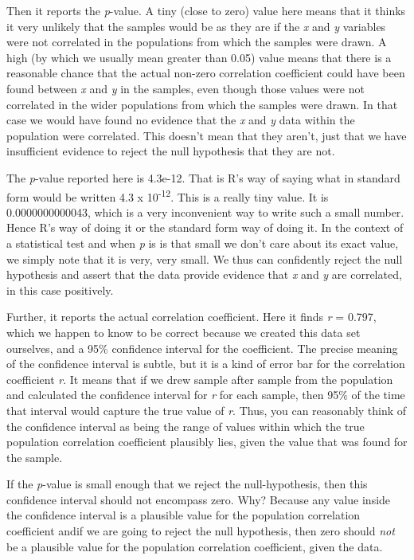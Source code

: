 \documentclass[
  letterpaper,
  DIV=11,
  numbers=noendperiod]{scrreprt}
\begin{document}
Then it reports the \emph{p}-value. A tiny (close to zero) value here
means that it thinks it very unlikely that the samples would be as they
are if the \emph{x} and \emph{y} variables were not correlated in the
populations from which the samples were drawn. A high (by which we
usually mean greater than 0.05) value means that there is a reasonable
chance that the actual non-zero correlation coefficient could have been
found between \emph{x} and \emph{y} in the samples, even though those
values were not correlated in the wider populations from which the
samples were drawn. In that case we would have found no evidence that
the \emph{x} and \emph{y} data within the population were correlated.
This doesn't mean that they aren't, just that we have insufficient
evidence to reject the null hypothesis that they are not.

The \emph{p}-value reported here is 4.3e-12. That is R's way of saying
what in standard form would be written 4.3 x 10\textsuperscript{-12}.
This is a really tiny value. It is 0.0000000000043, which is a very
inconvenient way to write such a small number. Hence R's way of doing it
or the standard form way of doing it. In the context of a statistical
test and when \emph{p} is is that small we don't care about its exact
value, we simply note that it is very, very small. We thus can
confidently reject the null hypothesis and assert that the data provide
evidence that \emph{x} and \emph{y} are correlated, in this case
positively.

Further, it reports the actual correlation coefficient. Here it finds
\emph{r} = 0.797, which we happen to know to be correct because we
created this data set ourselves, and a 95\% confidence interval for the
coefficient. The precise meaning of the confidence interval is subtle,
but it is a kind of error bar for the correlation coefficient \emph{r}.
It means that if we drew sample after sample from the population and
calculated the confidence interval for \emph{r} for each sample, then
95\% of the time that interval would capture the true value of \emph{r}.
Thus, you can reasonably think of the confidence interval as being the
range of values within which the true population correlation coefficient
plausibly lies, given the value that was found for the sample.

If the \emph{p}-value is small enough that we reject the
null-hypothesis, then this confidence interval should not encompass
zero. Why? Because any value inside the confidence interval is a
plausible value for the population correlation coefficient andif we are
going to reject the null hypothesis, then zero should \emph{not} be a
plausible value for the population correlation coefficient, given the
data.
\end{document}
